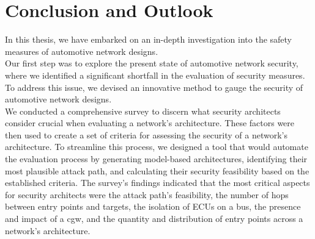 \chapter{Conclusion and Outlook}
\label{chp:conclusion}

In this thesis, we have embarked on an in-depth investigation into the safety measures of automotive network designs.\\

Our first step was to explore the present state of automotive network security, 
where we identified a significant shortfall in the evaluation of security measures. 
To address this issue, we devised an innovative method to gauge the security of automotive network designs.\\

We conducted a comprehensive survey to discern what security architects consider crucial when evaluating a network's architecture. 
These factors were then used to create a set of criteria for assessing the security of a network's architecture. 
To streamline this process, we designed a tool that would automate the evaluation process by generating model-based architectures, 
identifying their most plausible attack path, and calculating their security feasibility based on the established criteria.
The survey's findings indicated that the most critical aspects for security architects were the attack path's feasibility, 
the number of hops between entry points and targets, the isolation of ECUs on a bus, 
the presence and impact of a \acrlong{cgw}, and the quantity and distribution of entry points across a network's architecture.\\


